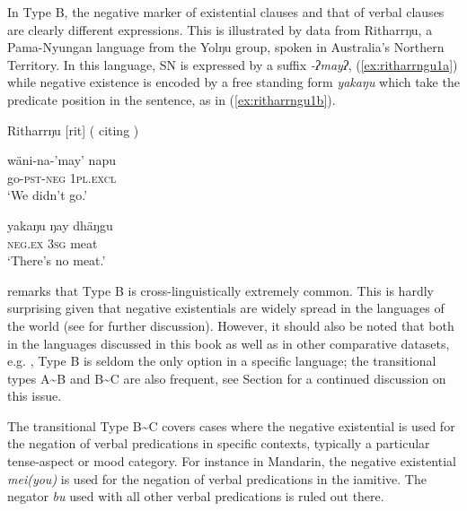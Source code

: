 \documentclass[output=paper,chinesefont,colorlinks,citecolor=brown]{langscibook}
\begin{document}
In Type B, the negative marker of existential clauses and that of verbal clauses are clearly different expressions. This is illustrated by data from Ritharrŋu, a Pama-Nyungan language from the Yolŋu group, spoken in Australia’s Northern Territory. In this language, SN is expressed by a suffix \textit{-ʔmayʔ}, (\ref{ex:ritharrngu1a}) while negative existence is encoded by a free standing form \textit{yakaŋu} which take the predicate position in the sentence, as in (\ref{ex:ritharrngu1b}).

\begin{exe}
\ex Ritharrŋu [rit] ( citing \citet[101--102]{Heath1981}) \label{ex:ritharrngu1}
\begin{xlist}
\ex \label{ex:ritharrngu1a}
\gll wäni-na-'may' napu\\
go-\textsc{pst-neg} \textsc{1pl.excl}\\
\glt  `We didn't go.'

\ex \label{ex:ritharrngu1b}
\gll yakaŋu ŋay dhäŋgu\\
\textsc{neg.ex} 3\textsc{sg} meat\\
\glt `There's no meat.'

\end{xlist}
\end{exe}
\citet[18--19]{Croft1991} remarks that Type B is cross-linguistically extremely common. This is hardly surprising given that negative existentials are widely spread in the languages of the world (see  for further discussion). However, it should also be noted that both in the languages discussed in this book as well as in other comparative datasets, e.g. \citet{Veselinova2016}, Type B is seldom the only option in a specific language; the transitional types A{\textasciitilde}B and B{\textasciitilde}C are also frequent, see Section   for a continued discussion on this issue.

The transitional Type B{\textasciitilde}C covers cases where the negative existential is used for the negation of verbal predications in specific contexts, typically a particular tense-aspect or mood category. For instance in Mandarin, the negative existential \textit{mei(you)} is used for the negation of verbal predications in the iamitive. The negator \textit{bu} used with all other verbal predications is ruled out there.
\end{document}
